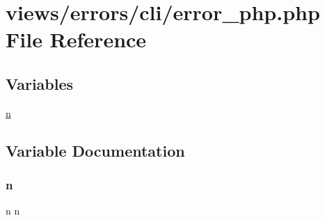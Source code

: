 \hypertarget{cli_2error__php_8php}{}\section{views/errors/cli/error\+\_\+php.php File Reference}
\label{cli_2error__php_8php}
\subsection*{Variables}
\begin{DoxyCompactItemize}
\item 
\mbox{\hyperlink{cli_2error__php_8php_a2e6b16bbc42094e4c51ade3c10afdcf1}{n}}
\end{DoxyCompactItemize}


\subsection{Variable Documentation}
\mbox{\label{cli_2error__php_8php_a2e6b16bbc42094e4c51ade3c10afdcf1}} 
\subsubsection{\texorpdfstring{n}{n}}
{\footnotesize\ttfamily n n}

